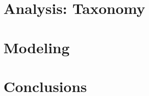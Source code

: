 \documentclass[11pt,a4paper]{article}
\begin{document}
\section{Analysis: Taxonomy}
\label{sec:taxo}


\section{Modeling}
\label{sec:modeling}


\section{Conclusions}
\label{sec:conc}




% 
\end{document}
